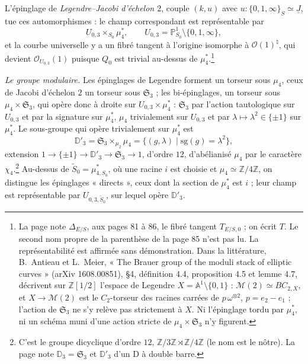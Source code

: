\documentclass[11pt,a4paper]{article}
\begin{document}
L'épinglage de \emph{Legendre--Jacobi d'échelon $2$}, couple $(k, u)$ avec $u :
\{0, 1, \infty\}_S \simeq \underline{J}$, tue ces automorphismes : le champ
correspondant est représentable par
\[
U_{0,3} \times_{S_0} \mu_4^{*}, \qquad U_{0,3} = \mathbb{P}^1_{S_0} \setminus
\{0, 1, \infty\},
\]
et la courbe universelle y a un fibré tangent à l'origine isomorphe à
$\mathcal{O}(1)^{\natural}$, qui devient $\mathcal{O}_{U_{0,3}}(1)$ puisque
$Q_{0}$ est trivial au-dessus de $\mu_4^{*}$.\footnote{La page note
$\Delta_{E/S}$, aux pages 81 à 86, le fibré tangent $T_{E/S,0}$ ; on écrit
$T$. Le second nom propre de la parenthèse de la page 85 n'est pas lu. La
représentabilité est affirmée sans démonstration. Dans la littérature,
B.~Antieau et L.~Meier, « The Brauer group of the moduli stack of elliptic
curves » (arXiv 1608.00851), §4, définition 4.4, proposition 4.5 et lemme
4.7, décrivent sur $\mathbb{Z}[1/2]$ l'espace de Legendre $X = \mathbb{A}^1
\setminus \{0, 1\}$ : $\mathcal{M}(2) \simeq B C_{2,X}$, et $X \to
\mathcal{M}(2)$ est le $C_2$-torseur des racines carrées de $p\,\omega^{\otimes
2}$, $p = e_2 - e_1$ ; l'action de $\mathfrak{S}_3$ ne s'y relève pas
strictement à $X$. Ni l'épinglage tordu par $\mu_4^{*}$, ni un schéma muni
d'une action stricte de $\mu_4 \times \mathfrak{S}_3$ n'y figurent.}

\emph{Le groupe modulaire.} Les épinglages de Legendre forment un torseur sous
$\mu_4$, ceux de Jacobi d'échelon $2$ un torseur sous $\mathfrak{S}_3$ ; les
bi-épinglages, un torseur sous $\mu_4 \times \mathfrak{S}_3$, qui opère donc à
droite sur $U_{0,3} \times \mu_4^{*}$ : $\mathfrak{S}_3$ par l'action
tautologique sur $U_{0,3}$ et par la signature sur $\mu_4^{*}$, $\mu_4$
trivialement sur $U_{0,3}$ et par $\lambda \mapsto \lambda^2 \in \{\pm 1\}$ sur
$\mu_4^{*}$. Le sous-groupe qui opère trivialement sur $\mu_4^{*}$ est
\[
\mathbb{D}'_3 = \mathfrak{S}_3 \times_{\mu_2} \mu_4 = \{(g, \lambda) \mid
\mathrm{sg}(g) = \lambda^2\},
\]
extension $1 \to \{\pm 1\} \to \mathbb{D}'_3 \to \mathfrak{S}_3 \to 1$, d'ordre
$12$, d'abélianisé $\mu_4$ par le caractère $\chi_4$.\footnote{C'est le groupe
dicyclique d'ordre $12$, $\mathbb{Z}/3\mathbb{Z} \rtimes \mathbb{Z}/4\mathbb{Z}$
(le nom est le nôtre). La page note $\mathbb{D}_3 = \mathfrak{S}_3$ et
$\mathbb{D}'_3$ d'un D à double barre.} Au-dessus de $\widetilde{S}_0 =
\mu^{*}_{4,S_0}$, où une racine $i$ est choisie et $\mu_4 \simeq
\mathbb{Z}/4\mathbb{Z}$, on distingue les épinglages « directs », ceux dont la
section de $\mu_4^{*}$ est $i$ ; leur champ est représentable par
$U_{0,3,\widetilde{S}_0}$, sur lequel opère $\mathbb{D}'_3$.
\end{document}
